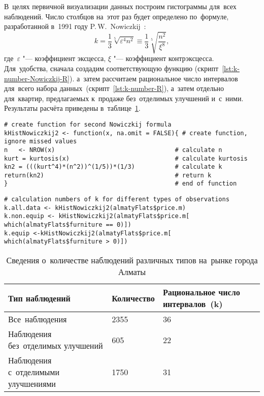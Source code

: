 \documentclass[]{scrreprt}
\begin{document}
В~целях первичной визуализации данных построим гистограммы для~всех наблюдений. Число столбцов на~этот раз будет определено по~формуле, разработанной в~1991 году P.\,W.~Nowiczkij~\cite{Nowiczkij:oczenka-pogresh}:
\begin{equation}\label{eq:k-hist_Nowiczkij}
k = \frac{1}{3}\sqrt[5]{\varepsilon^4 n^2} \equiv \frac{1}{3} \sqrt[5]{\frac{n^2}{\xi^8}}, 
\end{equation}
где~$\varepsilon$ "--- коэффициент эксцесса, $\xi$ "--- коэффициент контрэксцесса. Для~удобства, сначала создадим соответствующую функцию (скрипт~\ref{lst:k-number-Nowiczkij-R}). а~затем рассчитаем рациональное число интервалов для~всего набора данных~(скрипт~\ref{lst:k-number-R}), а~затем отдельно для~квартир, предлагаемых к~продаже без~отделимых улучшений и~с~ними. Результаты расчёта приведены в~таблице~\ref{tab:numbers-of-observations-almaty-R}.
%
\begin{lstlisting}[float, caption = Создание функции для~расчёта~k по~формуле P.\,W.~Nowiczkij, firstnumber=1, label= lst:k-number-Nowiczkij-R]
# create function for second Nowiczkij formula
kHistNowiczkij2 <- function(x, na.omit = FALSE){ # create function, ignore missed values
n   <- NROW(x)                                 # calculate n
kurt = kurtosis(x)                             # calculate kurtosis
kn2 = (((kurt^4)*(n^2))^(1/5))*(1/3)           # calculate k
return(kn2)                                    # return k  
}                                              # end of function
\end{lstlisting} 
%
\begin{lstlisting}[float, caption = Расчёт~k по~формуле P.\,W.~Nowiczkij для~наблюдений различных типов, firstnumber=1, label= lst:k-number-R]
# calculation numbers of k for different types of observations
k.all.data <- kHistNowiczkij2(almatyFlats$price.m)
k.non.equip <- kHistNowiczkij2(almatyFlats$price.m[ which(almatyFlats$furniture == 0)])
k.equip <-kHistNowiczkij2(almatyFlats$price.m[ which(almatyFlats$furniture > 0)])                                       
\end{lstlisting}
%
\begin{table}[ht]
	\caption{Сведения о~количестве наблюдений различных типов на~рынке города Алматы}\label{tab:numbers-of-observations-almaty-R}
	\centering
	\begin{tabular}{lll}
		\hline
		Тип наблюдений&Количество&Рациональное число интервалов~(k)\\
		\hline
		Все~наблюдения&2355&36\\
		\hline
		Наблюдения без~отделимых улучшений&605&22\\
		\hline
		Наблюдения с~отделимыми улучшениями&1750&31\\
		\hline
	\end{tabular}
\end{table}
%
\end{document}
